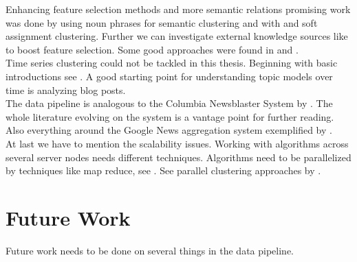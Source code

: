Enhancing feature selection methods and more semantic relations promising work was done by \cite{NounPhraseSemanticClustering@2009@Zheng} using noun phrases for semantic clustering and 
\cite{WordNetAndFuzzyAssociation@2010@Chen} with \wordnet{} and soft assignment clustering. Further we can investigate external knowledge sources like \wiki{} to boost feature selection. Some good approaches were found in \cite{WikipediaClusteringSim2009} and \cite{WikipediaClustering2010}.\\

Time series clustering could not be tackled in this thesis. Beginning with basic introductions see \cite{ClusteringTimesSeriesSurves2005, RecentTechniquesClusteringSurvey2012, IncrementalClustering2012}. A good starting point for understanding topic models over time is \cite{BlogTopicLDA2013} analyzing blog posts.\\

The data pipeline is analogous to the Columbia Newsblaster System by \cite{NewsBlaster2002}. The whole literature evolving on the system is a vantage point for further reading. Also everything around the Google News aggregation system exemplified by \cite{GoogleNews2007}.\\

At last we have to mention the scalability issues. Working with algorithms across several server nodes needs different techniques. Algorithms need to be parallelized by techniques like map reduce, see \cite{MapReduce2008}. See parallel clustering approaches by \cite{ParallelClustering2009}.

\section{Future Work}
\label{sec:future_work}
Future work needs to be done on several things in the data pipeline.

